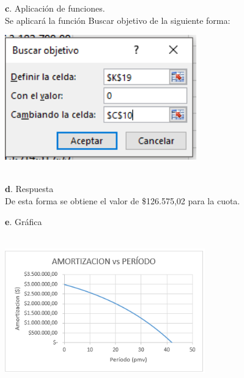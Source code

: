 \textbf{c}. Aplicación de funciones.
 \\
 
Se aplicará la función   Buscar  objetivo de la siguiente forma:     
 
 \begin{center}
	\includegraphics[height=5.4cm]{img/ch8/8_25.png}
\end{center}
\\ 
 
\textbf{d}. Respuesta\\

De esta forma se obtiene el valor de \$126.575,02 para la cuota.

\clearpage

\textbf{e}. Gráfica\\
\ \begin{center}
	\includegraphics[height=5.4cm]{img/ch8/8_26.png}
\end{center}





    

